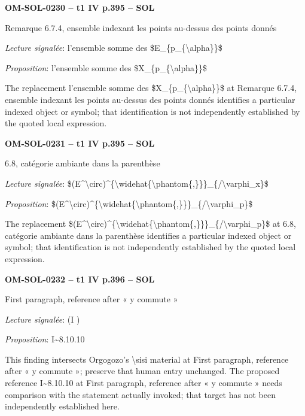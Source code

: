 \par\noindent\textbf{OM-SOL-0230 -- t1 IV p.395 -- SOL}\par
Remarque 6.7.4, ensemble indexant les points au-dessus des points donnés\par
\emph{Lecture signalée}: l'ensemble somme des \$E\_\{p\_\{\textbackslash{}alpha\}\}\$\par
\emph{Proposition}: l'ensemble somme des \$X\_\{p\_\{\textbackslash{}alpha\}\}\$\par
The replacement l'ensemble somme des \$X\_\{p\_\{\textbackslash{}alpha\}\}\$ at Remarque 6.7.4, ensemble indexant les points au-dessus des points donnés identifies a particular indexed object or symbol; that identification is not independently established by the quoted local expression.\par
\par\noindent\textbf{OM-SOL-0231 -- t1 IV p.395 -- SOL}\par
6.8, catégorie ambiante dans la parenthèse\par
\emph{Lecture signalée}: \$(E\textasciicircum{}\textbackslash{}circ)\textasciicircum{}\{\textbackslash{}widehat\{\textbackslash{}phantom\{,\}\}\}\_\{/\textbackslash{}varphi\_x\}\$\par
\emph{Proposition}: \$(E\textasciicircum{}\textbackslash{}circ)\textasciicircum{}\{\textbackslash{}widehat\{\textbackslash{}phantom\{,\}\}\}\_\{/\textbackslash{}varphi\_p\}\$\par
The replacement \$(E\textasciicircum{}\textbackslash{}circ)\textasciicircum{}\{\textbackslash{}widehat\{\textbackslash{}phantom\{,\}\}\}\_\{/\textbackslash{}varphi\_p\}\$ at 6.8, catégorie ambiante dans la parenthèse identifies a particular indexed object or symbol; that identification is not independently established by the quoted local expression.\par
\par\noindent\textbf{OM-SOL-0232 -- t1 IV p.396 -- SOL}\par
First paragraph, reference after « y commute »\par
\emph{Lecture signalée}: (I )\par
\emph{Proposition}: I\textasciitilde{}8.10.10\par
This finding intersects Orgogozo's \textbackslash{}sisi material at First paragraph, reference after « y commute »; preserve that human entry unchanged. The proposed reference I\textasciitilde{}8.10.10 at First paragraph, reference after « y commute » needs comparison with the statement actually invoked; that target has not been independently established here.\par
